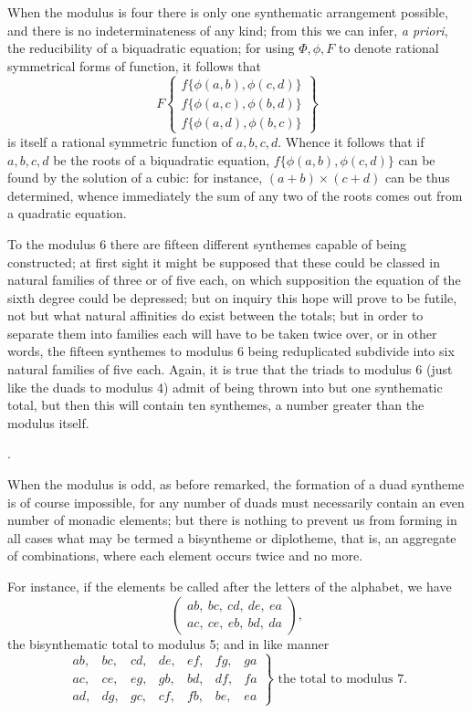 \documentclass[11pt]{article}
\newcommand{\tworow}[2]{\left(\begin{matrix}#1\\#2\end{matrix}\right)}
\begin{document}
{{{When the modulus is four there is only one synthematic arrangement possible, and there is no indeterminateness of any kind; from this we can infer, \emph{a priori}, the reducibility of a biquadratic equation; for using $\Phi,\phi,F$ to denote rational symmetrical forms of function, it follows that
\[
F\left\{\begin{array}{l}
f\{\phi(a,b),\phi(c,d)\}\\
f\{\phi(a,c),\phi(b,d)\}\\
f\{\phi(a,d),\phi(b,c)\}
\end{array}\right\}
\]
is itself a rational symmetric function of $a,b,c,d$.
Whence it follows that if $a,b,c,d$ be the roots of a biquadratic equation, $f\{\phi(a,b),\phi(c,d)\}$ can be found by the solution of a cubic: for instance, $(a+b)\times(c+d)$ can be thus determined, whence immediately the sum of any two of the roots comes out from a quadratic equation.

To the modulus 6 there are fifteen different synthemes capable of being constructed; at first sight it might be supposed that these could be classed in natural families of three or of five each, on which supposition the equation of the sixth degree could be depressed; but on inquiry this hope will prove to be futile, not but what natural affinities do exist between the totals; but in order to separate them into families each will have to be taken twice over, or in other words, the fifteen synthemes to modulus 6 being reduplicated subdivide into six natural families of five each. Again, it is true that the triads to modulus 6 (just like the duads to modulus 4) admit of being thrown into but one synthematic total, but then this will contain ten synthemes, a number greater than the modulus itself.}.

When the modulus is odd, as before remarked, the formation of a duad syntheme is of course impossible, for any number of duads must necessarily contain an even number of monadic elements; but there is nothing to prevent us from forming in all cases what may be termed a bisyntheme or diplotheme, that is, an aggregate of combinations, where each element occurs twice and no more.

For instance, if the elements be called after the letters of the alphabet, we have
\[
\tworow{ab,\ bc,\ cd,\ de,\ ea}{ac,\ ce,\ eb,\ bd,\ da},
\]
the bisynthematic total to modulus 5; and in like manner
\[
\left.\begin{array}{lllllll}
ab,&bc,&cd,&de,&ef,&fg,&ga\\
ac,&ce,&eg,&gb,&bd,&df,&fa\\
ad,&dg,&gc,&cf,&fb,&be,&ea
\end{array}\right\}\text{ the total to modulus }7.
\]

}}
\end{document}
